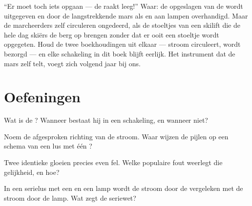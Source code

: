\begin{remark}\label{rem:g7:circuits-series-parallel:whyhard}
``Er moet toch iets opgaan --- de  raakt leeg!'' Waar: de
opgeslagen \emph{} van de  wordt uitgegeven en door
de langstrekkende mars als  en  aan lampen overhandigd.
Maar de marcheerders zelf circuleren ongedeerd, als de stoeltjes van
een skilift die de hele dag skiërs de berg op brengen zonder dat er
ooit een stoeltje wordt opgegeten. Houd de twee boekhoudingen uit
elkaar --- stroom circuleert,  wordt bezorgd --- en elke
schakeling in dit boek blijft eerlijk. Het instrument dat de mars zelf
telt, voegt zich volgend jaar bij ons.
\end{remark}

\section{Oefeningen}

\begin{exercise}[$\star$]\label{exo:g7:circuits-series-parallel:1}
Wat is de ? Wanneer bestaat hij in een
schakeling, en wanneer niet?
\end{exercise}

\begin{exercise}[$\star$]\label{exo:g7:circuits-series-parallel:2}
Noem de afgesproken richting van de stroom. Waar wijzen de pijlen op
een schema van een lus met één ?
\end{exercise}

\begin{exercise}[$\star$]\label{exo:g7:circuits-series-parallel:3}
Twee identieke   gloeien precies even fel. Welke
populaire fout weerlegt die gelijkheid, en hoe?
\end{exercise}

\begin{exercise}[$\star$]\label{exo:g7:circuits-series-parallel:4}
In een serielus met een  en een lamp wordt de stroom door de
 vergeleken met de stroom door de lamp. Wat zegt de seriewet?
\end{exercise}


